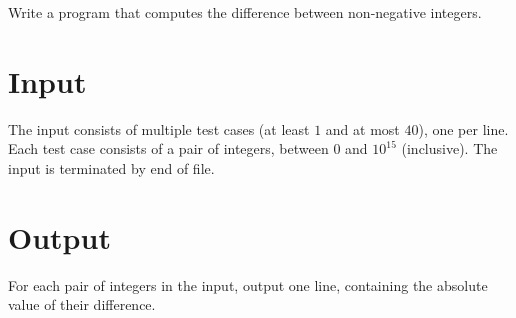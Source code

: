 
Write a program that computes the difference between non-negative integers.

\section*{Input}

The input consists of multiple test cases (at least $1$ and at most
$40$), one per line.  Each test case consists of a pair of integers,
between $0$ and $10^{15}$ (inclusive).  The input is terminated by
end of file.

\section*{Output}

For each pair of integers in the input, output one line, containing the absolute value of their difference.
